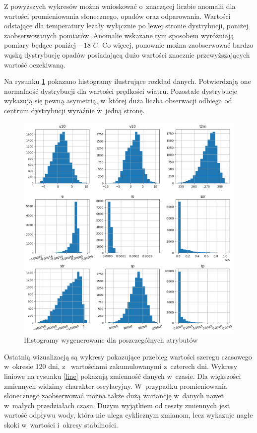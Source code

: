 Z powyższych wykresów można wnioskować o~znaczącej liczbie anomalii dla wartości promieniowania słonecznego,
opadów oraz odparowania. Wartości odstające dla temperatury leżały wyłącznie po lewej stronie dystrybucji,
poniżej zaobserwowanych pomiarów. Anomalie wskazane tym sposobem wyróżniają pomiary będące poniżej $-18^\circ C$. Co więcej, ponownie można zaobserwować bardzo wąską dystrybucję opadów posiadającą dużo wartości znacznie
przewyższających wartość oczekiwaną. 

Na rysunku \ref{hist} pokazano histogramy ilustrujące rozkład danych. Potwierdzają one normalność dystrybucji
dla wartości prędkości wiatru. Pozostałe dystrybucje wykazują się pewną asymetrią, w~której duża liczba 
obserwacji odbiega od centrum dystrybucji wyraźnie w~jedną stronę. 

\begin{figure}[H]
    \centering
    \includegraphics[width=\textwidth]{images/hist.png}
    \caption{Histogramy wygenerowane dla poszczególnych atrybutów}
    \label{hist}
\end{figure}

Ostatnią wizualizacją są wykresy pokazujące przebieg wartości szeregu czasowego w~okresie 120 dni, z~
wartościami zakumulowanymi z~czterech dni. Wykresy liniowe na rysunku \ref{line} pokazują zmienność
danych w~czasie. Dla większości zmiennych widzimy charakter oscylacyjny. W~przypadku promieniowania 
słonecznego zaobserwować można także dużą wariancję w~danych nawet w~małych przedziałach czasu. 
Dużym wyjątkiem od reszty zmiennych jest wartość odpływu wody, która nie ulega cyklicznym zmianom, lecz
wykazuje nagłe skoki w~wartości i~okresy stabilności.

